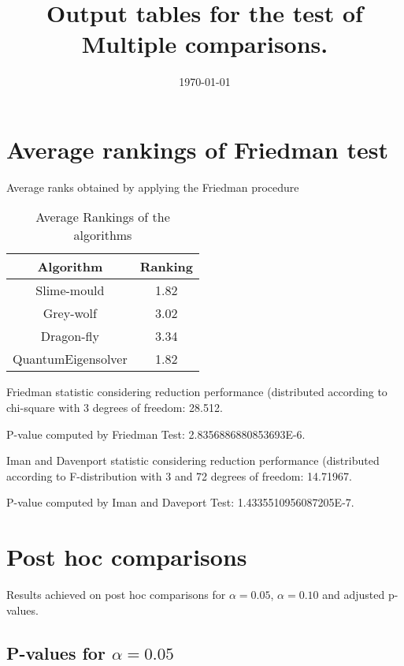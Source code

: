 \documentclass[a4paper,10pt]{article}
\title{Output tables for the test of Multiple comparisons.}
\author{}
\date{\today}
\begin{document}
\begin{landscape}
\pagestyle{empty}
\maketitle
\thispagestyle{empty}
\section{Average rankings of Friedman test}



Average ranks obtained by applying the Friedman procedure

\begin{table}[!htp]
\centering
\begin{tabular}{|c|c|}\hline
Algorithm&Ranking\\\hline
Slime-mould & 1.82\\
Grey-wolf & 3.02\\
Dragon-fly & 3.34\\
QuantumEigensolver & 1.82\\
\hline
\end{tabular}
\caption{Average Rankings of the algorithms}
\end{table}

Friedman statistic considering reduction performance (distributed according to chi-square with 3 degrees of freedom: 28.512.

P-value computed by Friedman Test: 2.8356886880853693E-6.\newline

Iman and Davenport statistic considering reduction performance (distributed according to F-distribution with 3 and 72 degrees of freedom: 14.71967.

P-value computed by Iman and Daveport Test: 1.4335510956087205E-7.\newline



\pagebreak

\section{Post hoc comparisons}

Results achieved on post hoc comparisons for $\alpha = 0.05$, $\alpha = 0.10$ and adjusted p-values.

\subsection{P-values for $\alpha=0.05$}


\end{landscape}
\end{document}
